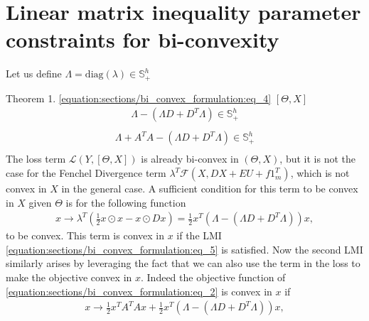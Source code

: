 \documentclass[letterpaper,10pt,english]{sphinxmanual}
\begin{document}
\section{Linear matrix inequality parameter constraints for bi-convexity}
\label{\detokenize{sections/bi_convex_formulation:linear-matrix-inequality-parameter-constraints-for-bi-convexity}}
Let us define \(\Lambda = \text{diag}(\lambda) \in \mathbb{S}_+^h\)

Theorem 1.  \eqref{equation:sections/bi_convex_formulation:eq_4}  \([\Theta,X]\) 
\begin{equation}\label{equation:sections/bi_convex_formulation:eq_5}
\begin{split}\Lambda - (\Lambda D + D^T \Lambda) \in \mathbb{S}_+^h \\\end{split}
\end{equation}\begin{equation}\label{equation:sections/bi_convex_formulation:eq_6}
\begin{split}\Lambda + A^TA - (\Lambda D + D^T \Lambda) \in \mathbb{S}_+^h \\\end{split}
\end{equation}
 The loss term \(\mathcal{L}(Y,[\Theta,X])\) is already bi-convex in \((\Theta,X)\), but it is not the case for the Fenchel
Divergence term \(\lambda^T \mathcal{F}(X,DX + EU + f1_m^T)\), which is not convex in \(X\) in the general case. A sufficient
condition for this term to be convex in \(X\) given \(\Theta\) is for the following function
\begin{equation*}
\begin{split}x \rightarrow \lambda^T(\frac{1}{2} x \odot x - x \odot Dx) = \frac{1}{2}x^T(\Lambda - (\Lambda D + D^T \Lambda))x,\end{split}
\end{equation*}
to be convex. This term is convex in \(x\) if the LMI \eqref{equation:sections/bi_convex_formulation:eq_5} is satisfied. Now the second LMI similarly arises by
leveraging the fact that we can also use the term in the loss to make the objective convex in \(x\). Indeed the
objective function of \eqref{equation:sections/bi_convex_formulation:eq_2} is convex in \(x\) if
\begin{equation*}
\begin{split}x \rightarrow \frac{1}{2}x^TA^TAx + \frac{1}{2}x^T(\Lambda - (\Lambda D + D^T \Lambda))x,\end{split}
\end{equation*}
\end{document}
